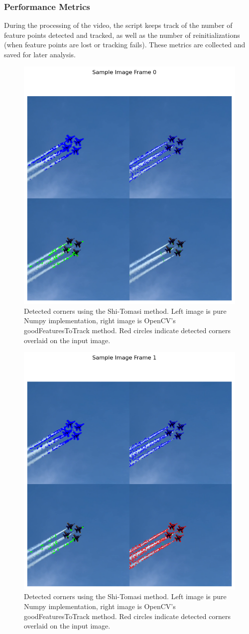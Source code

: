 \documentclass[11pt, conference, letterpaper]{IEEEtran}
\begin{document}
\subsubsection{Performance Metrics}
During the processing of the video, the script keeps track of the number of feature points detected and tracked, as well as the number of reinitializations (when feature points are lost or tracking fails). These metrics are collected and saved for later analysis.
\bigskip

\onecolumn
\begin{figure}[t]
    \centering
    \includegraphics[width=0.5\linewidth]{images/sample_image_0.png}
    \caption{Detected corners using the Shi-Tomasi method. Left image is pure Numpy implementation, right image is OpenCV's goodFeaturesToTrack method. Red circles indicate detected corners overlaid on the input image.}
    \label{fig:sample_1}
\end{figure}


\begin{figure}[h]
    \centering
    \includegraphics[width=0.5\linewidth]{images/sample_image_1.png}
    \caption{Detected corners using the Shi-Tomasi method. Left image is pure Numpy implementation, right image is OpenCV's goodFeaturesToTrack method. Red circles indicate detected corners overlaid on the input image.}
    \label{fig:sample_2}
\end{figure}
\end{document}
